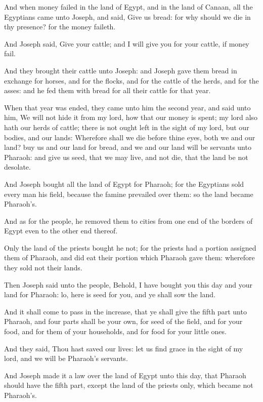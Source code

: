 \Verse And when money failed in the land of Egypt, and in the land of Canaan, all the Egyptians came unto Joseph, and said, Give us bread: for why should we die in thy presence? for the money faileth.

\Verse And Joseph said, Give your cattle; and I will give you for your cattle, if money fail.

\Verse And they brought their cattle unto Joseph: and Joseph gave them bread in exchange for horses, and for the flocks, and for the cattle of the herds, and for the asses: and he fed them with bread for all their cattle for that year.

\Verse When that year was ended, they came unto him the second year, and said unto him, We will not hide it from my lord, how that our money is spent; my lord also hath our herds of cattle; there is not ought left in the sight of my lord, but our bodies, and our lands: \Verse Wherefore shall we die before thine eyes, both we and our land?  buy us and our land for bread, and we and our land will be servants unto Pharaoh: and give us seed, that we may live, and not die, that the land be not desolate.

\Verse And Joseph bought all the land of Egypt for Pharaoh; for the Egyptians sold every man his field, because the famine prevailed over them: so the land became Pharaoh's.

\Verse And as for the people, he removed them to cities from one end of the borders of Egypt even to the other end thereof.

\Verse Only the land of the priests bought he not; for the priests had a portion assigned them of Pharaoh, and did eat their portion which Pharaoh gave them: wherefore they sold not their lands.

\Verse Then Joseph said unto the people, Behold, I have bought you this day and your land for Pharaoh: lo, here is seed for you, and ye shall sow the land.

\Verse And it shall come to pass in the increase, that ye shall give the fifth part unto Pharaoh, and four parts shall be your own, for seed of the field, and for your food, and for them of your households, and for food for your little ones.

\Verse And they said, Thou hast saved our lives: let us find grace in the sight of my lord, and we will be Pharaoh's servants.

\Verse And Joseph made it a law over the land of Egypt unto this day, that Pharaoh should have the fifth part, except the land of the priests only, which became not Pharaoh's.


